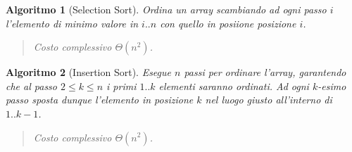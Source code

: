 \documentclass[oneside]{book}
\newtheorem{alg}{Algoritmo}
\begin{document}
\begin{alg}[Selection Sort]
  Ordina un array scambiando ad ogni passo $i$ l'elemento di minimo valore in
  $i..n$ con quello in posiione posizione $i$.

  \begin{algorithm}[H]

  \end{algorithm}
  \begin{quote}
    Costo complessivo $\Theta(n^2)$.
  \end{quote}
\end{alg}

\begin{alg}[Insertion Sort]
  Esegue $n$ passi per ordinare l'array, garantendo che al passo $2 \leq k \leq n$
  i primi $1..k$ elementi saranno ordinati. Ad ogni $k$-esimo passo sposta dunque
  l'elemento in posizione $k$ nel luogo giusto all'interno di $1..k-1$.

  \begin{algorithm}[H]

  \end{algorithm}
  \begin{quote}
    Costo complessivo $\Theta(n^2)$.
  \end{quote}
\end{alg}
\end{document}

